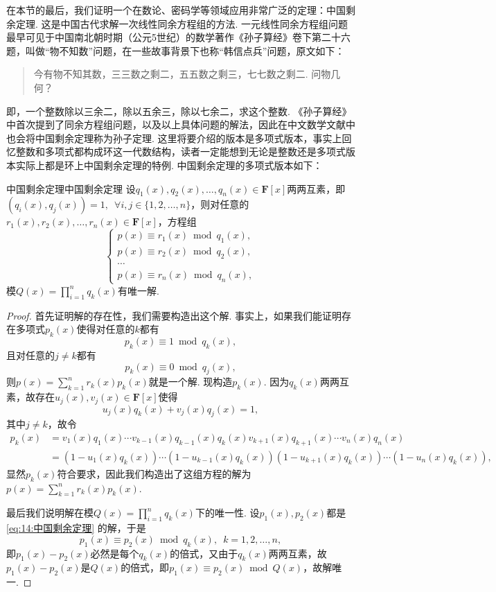 在本节的最后，我们证明一个在数论、密码学等领域应用非常广泛的定理：中国剩余定理. 这是中国古代求解一次线性同余方程组的方法. 一元线性同余方程组问题最早可见于中国南北朝时期（公元5世纪）的数学著作《孙子算经》卷下第二十六题，叫做``物不知数''问题，在一些故事背景下也称``韩信点兵''问题，原文如下：
\begin{quote}
    \kaishu
    今有物不知其数，三三数之剩二，五五数之剩三，七七数之剩二. 问物几何？
\end{quote}
即，一个整数除以三余二，除以五余三，除以七余二，求这个整数. 《孙子算经》中首次提到了同余方程组问题，以及以上具体问题的解法，因此在中文数学文献中也会将中国剩余定理称为孙子定理. 这里将要介绍的版本是多项式版本，事实上回忆整数和多项式都构成环这一代数结构，读者一定能想到无论是整数还是多项式版本实际上都是环上中国剩余定理的特例. 中国剩余定理的多项式版本如下：
\begin{theorem}{中国剩余定理}{中国剩余定理}
    设$q_1(x),q_2(x),\ldots,q_n(x)\in\mathbf{F}[x]$两两互素，即$(q_i(x),q_j(x))=1,\enspace\forall i,j\in\{1,2,\ldots,n\}$，则对任意的$r_1(x),r_2(x),\ldots,r_n(x)\in\mathbf{F}[x]$，方程组
    \begin{equation} \label{eq:14:中国剩余定理}
        \begin{cases}
            p(x)\equiv r_1(x)\bmod{q_1(x)}, \\
            p(x)\equiv r_2(x)\bmod{q_2(x)}, \\
            \cdots                          \\
            p(x)\equiv r_n(x)\bmod{q_n(x)},
        \end{cases}
    \end{equation}
    模$Q(x)=\prod\limits_{i=1}^nq_k(x)$有唯一解.
\end{theorem}
\begin{proof}
    首先证明解的存在性，我们需要构造出这个解. 事实上，如果我们能证明存在多项式$p_k(x)$使得对任意的$k$都有
    \[p_k(x)\equiv 1\bmod{q_k(x)},\]
    且对任意的$j\neq k$都有
    \[p_k(x)\equiv 0\bmod{q_j(x)},\]
    则$p(x)=\sum\limits_{k=1}^nr_k(x)p_k(x)$就是一个解. 现构造$p_k(x)$. 因为$q_k(x)$两两互素，故存在$u_j(x),v_j(x)\in\mathbf{F}[x]$使得
    \[u_j(x)q_k(x)+v_j(x)q_j(x)=1,\]
    其中$j\neq k$，故令
    \begin{align*}
        p_k(x) & =v_1(x)q_1(x)\cdots v_{k-1}(x)q_{k-1}(x)q_k(x)v_{k+1}(x)q_{k+1}(x)\cdots v_n(x)q_n(x)  \\
               & =(1-u_1(x)q_k(x))\cdots(1-u_{k-1}(x)q_k(x))(1-u_{k+1}(x)q_k(x))\cdots(1-u_n(x)q_k(x)),
    \end{align*}
    显然$p_k(x)$符合要求，因此我们构造出了这组方程的解为$p(x)=\sum\limits_{k=1}^nr_k(x)p_k(x)$.

    最后我们说明解在模$Q(x)=\prod\limits_{i=1}^nq_k(x)$下的唯一性. 设$p_1(x),p_2(x)$都是\autoref{eq:14:中国剩余定理} 的解，于是
    \[p_1(x)\equiv p_2(x)\bmod{q_k(x)},\enspace k=1,2,\ldots,n,\]
    即$p_1(x)-p_2(x)$必然是每个$q_k(x)$的倍式，又由于$q_k(x)$两两互素，故$p_1(x)-p_2(x)$是$Q(x)$的倍式，即$p_1(x)\equiv p_2(x)\bmod{Q(x)}$，故解唯一.
\end{proof}

